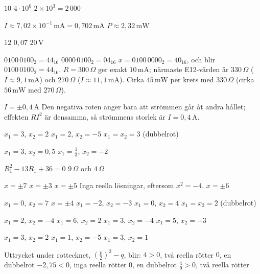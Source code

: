 
\begin{facit}

  $10$  $4 \cdot 10^6$  $2 \times 10^3 = 2\,000$

  $I \approx 7{,}02 \times 10^{-1}\,\text{mA} = 0{,}702\,\text{mA}$
 $P \approx 2{,}32\,\text{mW}$

  $12$  $0{,}07$  $20\,\text{V}$

  $0100\,0100_2 = \mathrm{44}_{16}$  $0000\,0100_2 = \mathrm{04}_{16}$
 $x = 0100\,0000_2 = \mathrm{40}_{16}$, och  blir
$0100\,0100_2 = \mathrm{44}_{16}$.
 $R = 300\,\Omega$ ger exakt $10\,\text{mA}$; närmaste E12-värden är $330\,\Omega$
($I \approx 9{,}1\,\text{mA}$) och $270\,\Omega$ ($I \approx 11{,}1\,\text{mA}$).
 Cirka $45\,\text{mW}$ per krets med $330\,\Omega$ (cirka $56\,\text{mW}$ med
$270\,\Omega$).

  $I = \pm 0{,}4\,\text{A}$
 Den negativa roten anger bara att strömmen går åt andra hållet; effekten $RI^2$ är
densamma, så strömmens storlek är $I = 0{,}4\,\text{A}$.

  $x_1 = 3$, $x_2 = 2$  $x_1 = 2$, $x_2 = -5$
 $x_1 = x_2 = 3$ (dubbelrot)

  $x_1 = 3$, $x_2 = 0{,}5$  $x_1 = \frac{1}{3}$, $x_2 = -2$

  $R_1^2 - 13R_1 + 36 = 0$  $9\,\Omega$ och $4\,\Omega$

  $x = \pm 7$  $x = \pm 3$  $x = \pm 5$
 Inga reella lösningar, eftersom $x^2 = -4$.  $x = \pm 6$

  $x_1 = 0$, $x_2 = 7$  $x = \pm 4$  $x_1 = -2$, $x_2 = -3$
 $x_1 = 0$, $x_2 = 4$  $x_1 = x_2 = 2$ (dubbelrot)

  $x_1 = 2$, $x_2 = -4$  $x_1 = 6$, $x_2 = 2$  $x_1 = 3$, $x_2 = -4$
 $x_1 = 5$, $x_2 = -3$

  $x_1 = 3$, $x_2 = 2$  $x_1 = 1$, $x_2 = -5$  $x_1 = 3$, $x_2 = 1$

 Uttrycket under rottecknet, $\left(\frac{p}{2}\right)^2 - q$, blir:
 $4 > 0$, två reella rötter  $0$, en dubbelrot
 $-2{,}75 < 0$, inga reella rötter  $0$, en dubbelrot
 $\frac{4}{9} > 0$, två reella rötter


\end{facit}
